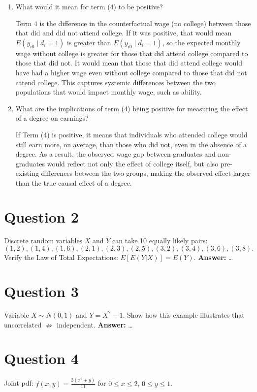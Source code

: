 \documentclass[12pt,a4paper]{article}
\begin{document}
\begin{enumerate}[label=(\alph*)]
  \item What would it mean for term (4) to be positive?

  Term 4 is the difference in the counterfactual wage (no college) between those that did and did not attend college. If it was positive, that would mean $E(y_{i0} \mid d_i = 1)$ is greater than $E(y_{i0} \mid d_i = 1)$, so the expected monthly wage without college is greater for those that did attend college compared to those that did not. It would mean that those that did attend college would have had a higher wage even without college compared to those that did not attend college. This captures systemic differences between the two populations that would impact monthly wage, such as ability.
  
  \item What are the implications of term (4) being positive for measuring the effect of a degree on earnings?

 If Term (4) is positive, it means that individuals who attended college would still earn more, on average, than those who did not, even in the absence of a degree. As a result, the observed wage gap between graduates and non-graduates would reflect not only the effect of college itself, but also pre-existing differences between the two groups, making the observed effect larger than the true causal effect of a degree.
 
\end{enumerate}

\section*{Question 2}
Discrete random variables $X$ and $Y$ can take 10 equally likely pairs:
\[
(1, 2), (1, 4), (1, 6), (2, 1), (2, 3), (2, 5), (3, 2), (3, 4), (3, 6), (3, 8).
\]
Verify the Law of Total Expectations: $E[E(Y|X)] = E(Y)$.  
\textbf{Answer:} \ldots

\section*{Question 3}
Variable $X \sim N(0,1)$ and $Y = X^2 - 1$. Show how this example illustrates that uncorrelated $\not\Rightarrow$ independent.  
\textbf{Answer:} \ldots

\section*{Question 4}
Joint pdf: $f(x, y) = \frac{3(x^2 + y)}{11}$ for $0 \leq x \leq 2$, $0 \leq y \leq 1$.
\end{document}

